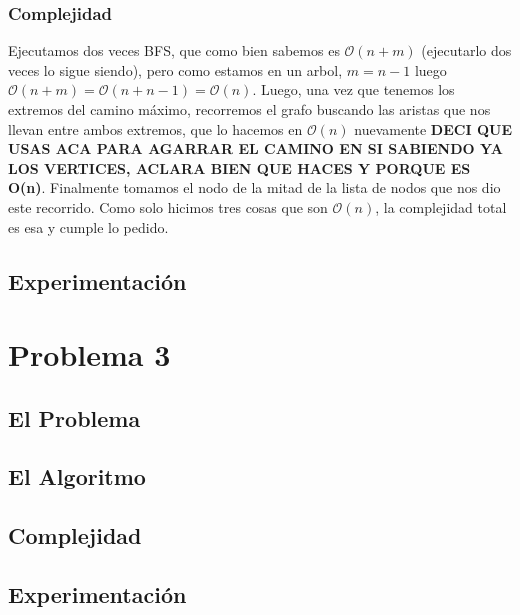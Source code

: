 \documentclass[A4paper,oneside,fleqn,11pt]{article}
\theoremstyle{definition}
\begin{document}
\subsubsection{Complejidad}

Ejecutamos dos veces BFS, que como bien sabemos es $\mathcal{O} (n+m)$ (ejecutarlo dos veces lo sigue siendo), pero como estamos en un arbol, $m=n-1$ luego $\mathcal{O} (n+m) =\mathcal{O} (n+n-1)=\mathcal{O} (n)$. Luego, una vez que tenemos los extremos del camino máximo, recorremos el grafo buscando las aristas que nos llevan entre ambos extremos, que lo hacemos en $\mathcal{O} (n)$ nuevamente \textbf{DECI QUE USAS ACA PARA AGARRAR EL CAMINO EN SI SABIENDO YA LOS VERTICES, ACLARA BIEN QUE HACES Y PORQUE ES O(n)}. Finalmente tomamos el nodo de la mitad de la lista de nodos que nos dio este recorrido. Como solo hicimos tres cosas que son $\mathcal{O} (n)$, la complejidad total es esa y cumple lo pedido.

\subsection{Experimentación}

\section{Problema 3}

\subsection{El Problema}
\subsection{El Algoritmo}
\subsection{Complejidad}
\subsection{Experimentación}
\end{document}
